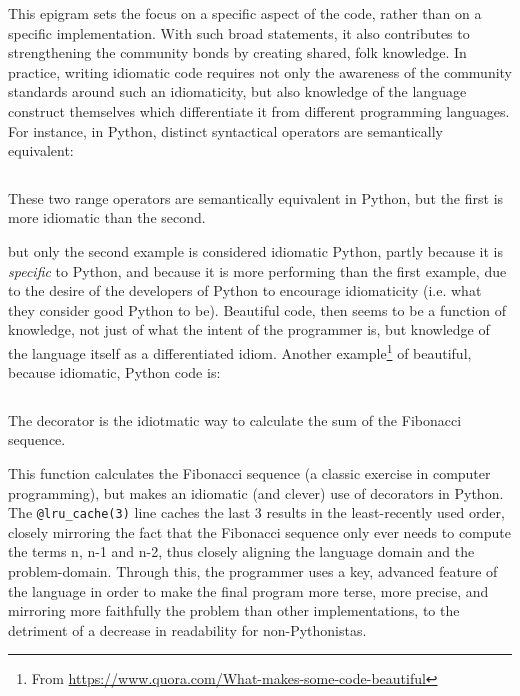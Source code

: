 This epigram sets the focus on a specific aspect of the code, rather than on a specific implementation. With such broad statements, it also contributes to strengthening the community bonds by creating shared, folk knowledge. In practice, writing idiomatic code requires not only the awareness of the community standards around such an idiomaticity, but also knowledge of the language construct themselves which differentiate it from different programming languages. For instance, in Python, distinct syntactical operators are semantically equivalent:

\begin{listing}
  \inputminted{python}{./corpus/range.py}
  \caption{These two range operators are semantically equivalent in Python, but the first is more idiomatic than the second.}
  \label{code:range-operator}
\end{listing}

but only the second example is considered idiomatic Python, partly because it is \emph{specific} to Python, and because it is more performing than the first example, due to the desire of the developers of Python to encourage idiomaticity (i.e. what they consider good Python to be). Beautiful code, then seems to be a function of knowledge, not just of what the intent of the programmer is, but knowledge of the language itself as a differentiated idiom. Another example\footnote{From \url{https://www.quora.com/What-makes-some-code-beautiful}} of beautiful, because idiomatic, Python code is:

\begin{listing}
  \inputminted{python}{./corpus/fibonacci.py}
  \caption{The decorator is the idiotmatic way to calculate the sum of the Fibonacci sequence.}
  \label{code:fibonacci}
\end{listing}

This function calculates the Fibonacci sequence (a classic exercise in computer programming), but makes an idiomatic (and clever) use of decorators in Python. The \lstinline{@lru_cache(3)} line caches the last 3 results in the least-recently used order, closely mirroring the fact that the Fibonacci sequence only ever needs to compute the terms n, n-1 and n-2, thus closely aligning the language domain and the problem-domain. Through this, the programmer uses a key, advanced feature of the language in order to make the final program more terse, more precise, and mirroring more faithfully the problem than other implementations, to the detriment of a decrease in readability for non-Pythonistas.

